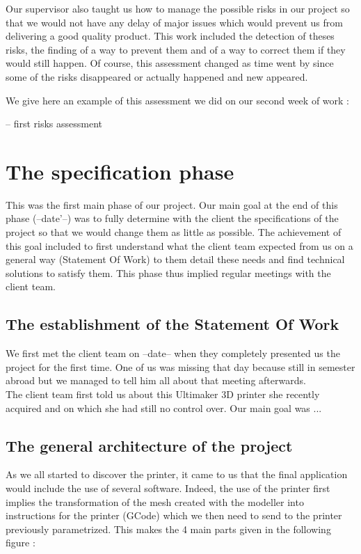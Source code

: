 \documentclass{report}
\begin{document}
Our supervisor also taught us how to manage the possible risks in our project so that we would not have any delay of major issues which would prevent us from delivering a good quality product. This work included the detection of theses risks, the finding of a way to prevent them and of a way to correct them if they would still happen. Of course, this assessment changed as time went by since some of the risks disappeared or actually happened and new appeared.

We give here an example of this assessment we did on our second week of work :

\bigskip
-- first risks assessment
\bigskip

\chapter{The specification phase}

This was the first main phase of our project. Our main goal at the end of this phase (--date'--)  was to fully determine with the client the specifications of the project so that we would change them as little as possible. The achievement  of this goal included to first understand what the client team expected from us on a general way (Statement Of Work) to them detail these needs and find technical solutions to satisfy them. This phase thus implied regular meetings with the client team.

\section{The establishment of the Statement Of Work}

We first met the client team on --date-- when they completely presented us the project for the first time. One of us was missing that day because still in semester abroad but we managed to tell him all about that meeting afterwards. \\

The client team first told us about this Ultimaker 3D printer she recently acquired and on which she had still no control over. Our main goal was ...

\section{The general architecture of the project}

As we all started to discover the printer, it came to us that the final application would include the use of several software. Indeed, the use of the printer first implies the transformation of the mesh created with the modeller into instructions for the printer (GCode) which we then need to send to the printer previously parametrized. This makes the 4 main parts given in the following figure :
\end{document}
